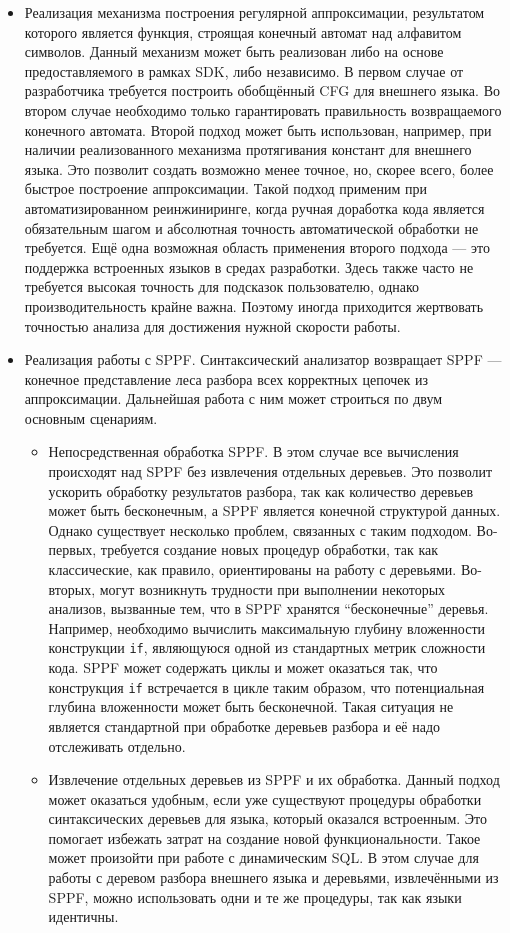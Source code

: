 \begin{itemize}
    \item Реализация механизма построения регулярной аппроксимации, результатом которого является функция, строящая конечный автомат над алфавитом символов. Данный механизм может быть реализован либо на основе предоставляемого в рамках SDK, либо независимо. В первом случае от разработчика требуется построить обобщённый CFG для внешнего языка. Во втором случае необходимо только гарантировать правильность возвращаемого конечного автомата. Второй подход может быть использован, например, при наличии реализованного механизма протягивания констант для внешнего языка. Это позволит создать возможно менее точное, но, скорее всего, более быстрое построение аппроксимации. Такой подход применим при автоматизированном реинжиниринге, когда ручная доработка кода является обязательным шагом и абсолютная точность автоматической обработки не требуется. Ещё одна возможная область применения второго подхода --- это поддержка встроенных языков в средах разработки. Здесь также часто не требуется высокая точность для подсказок пользователю, однако производительность крайне важна. Поэтому иногда приходится жертвовать точностью анализа для достижения нужной скорости работы.
    \item Реализация работы с SPPF. Синтаксический анализатор возвращает SPPF --- конечное представление леса разбора всех корректных цепочек из аппроксимации. Дальнейшая работа с ним может строиться по двум основным сценариям.
    \begin{itemize}
        \item Непосредственная обработка SPPF. В этом случае все вычисления происходят над SPPF без извлечения отдельных деревьев. Это позволит ускорить обработку результатов разбора, так как количество деревьев может быть бесконечным, а SPPF является конечной структурой данных. Однако существует несколько проблем, связанных с таким подходом. Во-первых, требуется создание новых процедур обработки, так как классические, как правило, ориентированы на работу с деревьями. Во-вторых, могут возникнуть трудности при выполнении некоторых анализов, вызванные тем, что в SPPF хранятся ``бесконечные'' деревья. Например, необходимо вычислить максимальную глубину вложенности конструкции \verb|if|, являющуюся одной из стандартных метрик сложности кода. SPPF может содержать 
циклы и может оказаться так, что конструкция \verb|if| встречается в цикле таким образом, что потенциальная глубина вложенности может быть бесконечной. Такая ситуация не является стандартной при 
обработке деревьев разбора и её надо отслеживать отдельно.
        \item Извлечение отдельных деревьев из SPPF и их обработка. Данный подход может оказаться удобным, если уже существуют процедуры обработки синтаксических деревьев для языка, который оказался встроенным. Это помогает избежать затрат на создание новой функциональности. Такое может произойти при работе с динамическим SQL. В этом случае для работы с деревом разбора внешнего языка и деревьями, извлечёнными из SPPF, можно использовать одни и те же процедуры, так как языки идентичны.


\end{itemize}
\end{itemize}
